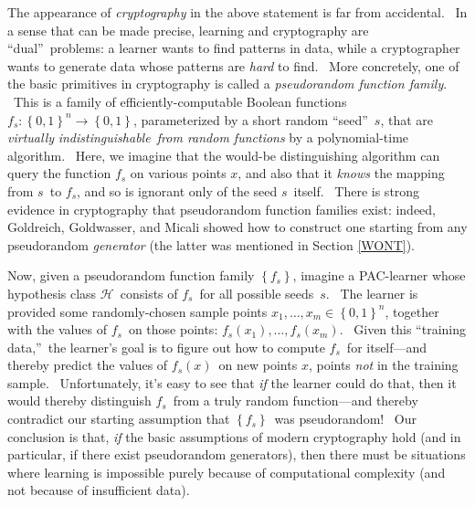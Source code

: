 \documentclass[11pt,onecolumn]{article}%
\begin{document}
The appearance of \textit{cryptography} in the above statement is far from
accidental. \ In a sense that can be made precise, learning and cryptography
are \textquotedblleft dual\textquotedblright\ problems: a learner wants to
find patterns in data, while a cryptographer wants to generate data whose
patterns are \textit{hard} to find. \ More concretely, one of the basic
primitives in cryptography is called a \textit{pseudorandom function family}.
\ This is a family of efficiently-computable Boolean functions $f_{s}:\left\{
0,1\right\}  ^{n}\rightarrow\left\{  0,1\right\}  $, parameterized by a short
random \textquotedblleft seed\textquotedblright\ $s$, that are
\textit{virtually} \textit{indistinguishable\ from random functions} by a
polynomial-time algorithm. \ Here, we imagine that the would-be distinguishing
algorithm can query the function $f_{s}$ on various points $x$, and also that
it \textit{knows} the mapping from $s$\ to $f_{s}$, and so is ignorant only of
the seed $s$\ itself. \ There is strong evidence in cryptography that
pseudorandom function families exist: indeed, Goldreich, Goldwasser, and
Micali \cite{ggm} showed how to construct one starting from any pseudorandom
\textit{generator} (the latter was mentioned in Section \ref{WONT}).

Now, given a pseudorandom function family $\left\{  f_{s}\right\}  $, imagine
a PAC-learner whose hypothesis class $\mathcal{H}$\ consists of $f_{s}$\ for
all possible seeds\ $s$. \ The learner is provided some randomly-chosen sample
points $x_{1},\ldots,x_{m}\in\left\{  0,1\right\}  ^{n}$, together with the
values of $f_{s}$\ on those points: $f_{s}\left(  x_{1}\right)  ,\ldots
,f_{s}\left(  x_{m}\right)  $. \ Given this \textquotedblleft training
data,\textquotedblright\ the learner's goal is to figure out how to compute
$f_{s}$\ for itself---and thereby predict the values of $f_{s}\left(
x\right)  $\ on new points $x$, points \textit{not} in the training sample.
\ Unfortunately, it's easy to see that \textit{if} the learner could do that,
then it would thereby distinguish $f_{s}$\ from a truly random function---and
thereby contradict our starting assumption that $\left\{  f_{s}\right\}
$\ was pseudorandom! \ Our conclusion is that, \textit{if} the basic
assumptions of modern cryptography hold (and in particular, if there exist
pseudorandom generators), then there must be situations where learning is
impossible purely because of computational complexity (and not because of
insufficient data).
\end{document}
